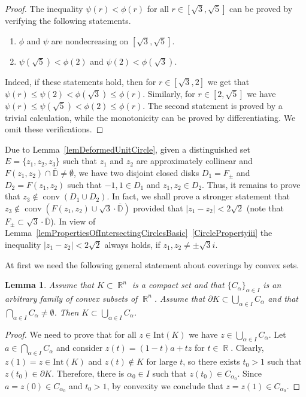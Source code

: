 \documentclass{amsart}
\numberwithin{equation}{section}
\newtheorem{lemma}[theorem]{Lemma}
\theoremstyle{definition}
\theoremstyle{remark}
\DeclareMathOperator{\conv}{conv}
\DeclareMathOperator{\RR}{\mathbb R}
\begin{document}
\begin{proof}
		The inequality $\psi(r) < \phi(r)$ for all $r \in [\sqrt{3}, \sqrt{5}]$ can be proved by verifying the following statements.
		\begin{enumerate}
			\item $\phi$ and $\psi$ are nondecreasing on $[\sqrt{3}, \sqrt{5}]$.
			\item $\psi(\sqrt{5}) < \phi(2)$ and $\psi(2) < \phi(\sqrt{3})$.
		\end{enumerate}
		Indeed, if these statements hold, then for $r \in [\sqrt{3}, 2]$ we get that $\psi(r) \le \psi(2) < \phi(\sqrt{3}) \le \phi(r)$. Similarly, for $r \in [2, \sqrt{5}]$ we have $\psi(r) \le \psi(\sqrt{5}) < \phi(2) \le \phi(r)$. The second statement is proved by a trivial calculation, while the monotonicity can be proved by differentiating. We omit these verifications.
	\end{proof}
	
	Due to Lemma~\ref{lemDeformedUnitCircle}, given a distinguished set $E = \{z_1, z_2, z_3\}$ such that $z_1$ and $z_2$ are approximately collinear and $F(z_1, z_2) \cap \overline{\mathbb D} \ne \emptyset$, we have two disjoint closed disks $D_1 = F_{\pm}$ and $D_2 = F(z_1, z_2)$ such that $-1, 1 \in D_1$ and $z_1, z_2 \in D_2$. Thus, it remains to prove that $z_3 \notin \conv(D_1 \cup D_2)$. In fact, we shall prove a stronger statement that $z_3 \notin \conv(F(z_1, z_2) \cup \sqrt{3}\cdot\overline{\mathbb D})$ provided that $|z_1 - z_2| < 2\sqrt{2}$ (note that $F_{\pm} \subset \sqrt{3}\cdot\overline{\mathbb D}$). In view of Lemma~\ref{lemPropertiesOfIntersectingCirclesBasic}~\ref{CirclePropertyiii} the inequality $|z_1 - z_2| < 2\sqrt{2}$ always holds, if $z_1, z_2 \ne \pm \sqrt{3}i$.
	
	At first we need the following general statement about coverings by convex sets.
	
	\begin{lemma}\label{lemConvexCovering}
		Assume that $K \subset \RR^n$ is a compact set and that $\{C_\alpha\}_{\alpha \in I}$ is an arbitrary family of convex subsets of $\RR^n$. Assume that $\partial K \subset \bigcup_{\alpha \in I} C_\alpha$ and that $\bigcap_{\alpha \in I} C_\alpha \ne \emptyset$. Then $K \subset \bigcup_{\alpha \in I} C_\alpha$.		
	\end{lemma}
	\begin{proof}
		We need to prove that for all $z \in \mathrm{Int}(K)$ we have $z \in \bigcup_{\alpha \in I} C_\alpha$. Let $a \in \bigcap_{\alpha \in I} C_\alpha$ and consider $z(t) = (1-t)a + tz$ for $t \in \RR$. Clearly, $z(1) = z \in \mathrm{Int}(K)$ and $z(t) \notin K$ for large $t$, so there exists $t_0 > 1$ such that $z(t_0) \in \partial K$. Therefore, there is $\alpha_0 \in I$ such that $z(t_0) \in C_{\alpha_0}$. Since $a = z(0) \in C_{\alpha_0}$ and $t_0 > 1$, by convexity we conclude that $z = z(1) \in C_{\alpha_0}$.
	\end{proof}
	
\end{document}
